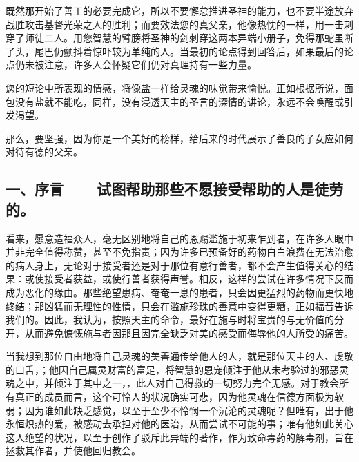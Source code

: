 既然那开始了善工的必要完成它，所以不要懈怠推进圣神的能力，也不要半途放弃战胜攻击基督光荣之人的胜利；而要效法您的真父亲，他像热忱的一样，用一击刺穿了师徒二人。用您智慧的臂膀将圣神的剑刺穿这两本异端小册子，免得那蛇虽断了头，尾巴仍颤抖着惊吓较为单纯的人。当最初的论点得到回答后，如果最后的论点仍未被注意，许多人会怀疑它们仍对真理持有一些力量。\par

您的短论中所表现的情感，将像盐一样给灵魂的味觉带来愉悦。正如根据所说，面包没有盐就不能吃，同样，没有浸透天主的圣言的深情的讲论，永远不会唤醒或引发渴望。\par

那么，要坚强，因为你是一个美好的榜样，给后来的时代展示了善良的子女应如何对待有德的父亲。\par


\subsection{一、序言——试图帮助那些不愿接受帮助的人是徒劳的。}

看来，愿意造福众人，毫无区别地将自己的恩赐滥施于初来乍到者，在许多人眼中并非完全值得称赞，甚至不免指责；因为许多已预备好的药物白白浪费在无法治愈的病人身上，无论对于接受者还是对于那位有意行善者，都不会产生值得关心的结果：或使接受者获益，或使行善者获得声誉。相反，这样的尝试在许多情况下反而成为恶化的缘由。那些绝望患病、奄奄一息的患者，只会因更猛烈的药物而更快地终结；那凶猛而无理性的性情，只会在滥施珍珠的善意中变得更糟，正如福音告诉我们的。因此，我认为，按照天主的命令，最好在施与时将宝贵的与无价值的分开，从而避免慷慨施与者因那且因完全缺乏对美的感受而侮辱他的人所受的痛苦。\par

当我想到那位自由地将自己灵魂的美善通传给他人的人，就是那位天主的人、虔敬的口舌，；他因自己属灵财富的富足，将智慧的恩宠倾注于他从未考验过的邪恶灵魂之中，并倾注于其中之一，，此人对自己得救的一切努力完全无感。对于教会所有真正的成员而言，这个可怜人的状况确实可悲，因为他灵魂在信德方面极为软弱；因为谁如此缺乏感觉，以至于至少不怜悯一个沉沦的灵魂呢？但唯有，出于他永恒炽热的爱，被感动去承担对他的医治，从而尝试不可能的事；唯有他如此关心这人绝望的状况，以至于创作了驳斥此异端的著作，作为致命毒药的解毒剂，旨在拯救其作者，并使他回归教会。\par

